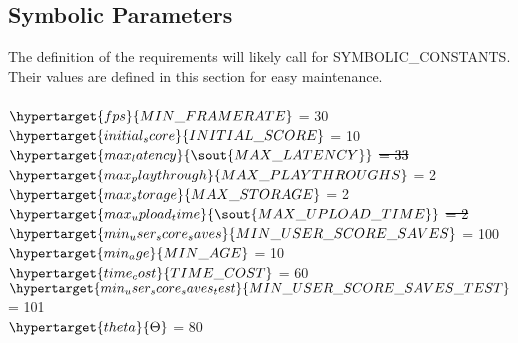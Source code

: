 \documentclass[12pt, titlepage]{article}
\begin{document}
\subsection{Symbolic Parameters}
The definition of the requirements will likely call for SYMBOLIC\_CONSTANTS. Their values are defined in this section for easy maintenance.\\ \\
$\hypertarget{fps}{MIN\_FRAMERATE}$ = 30 \\
$\hypertarget{initial_score}{INITIAL\_SCORE}$ = 10\\
$\hypertarget{max_latency}{\sout{MAX\_LATENCY}}$ \textcolor{black}{\sout{= 33}}\\
$\hypertarget{max_playthrough}{MAX\_PLAYTHROUGHS}$ = 2\\
$\hypertarget{max_storage}{MAX\_STORAGE}$ = 2\\
$\hypertarget{max_upload_time}{\sout{MAX\_UPLOAD\_TIME}}$ \textcolor{black}{\sout{= 2}}\\
$\hypertarget{min_user_score_saves}{MIN\_USER\_SCORE\_SAVES}$ = 100\\
$\hypertarget{min_age}{MIN\_AGE}$ = 10\\
$\hypertarget{time_cost}{TIME\_COST}$ = 60\\
$\hypertarget{min_user_score_saves_test}{MIN\_USER\_SCORE\_SAVES\_TEST}$ = 101 \\
$\hypertarget{theta}{\Theta}$ = 80
\end{document}
